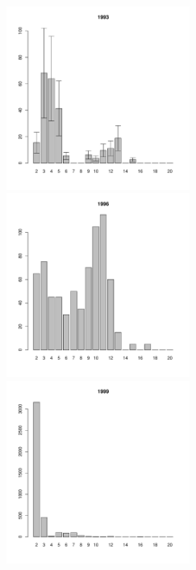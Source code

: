 \documentclass[12pt, a4paper]{article}
\begin{document}
\begin{figure}[h]
\begin{multicols}{3}
\end{multicols}



\begin{multicols}{3}
\hfill
\includegraphics[width=60mm]{../White_Sea/Luvenga_Goreliy/midlow2_1993_.pdf}
\hfill
\includegraphics[width=60mm]{../White_Sea/Luvenga_Goreliy/midlow2_1996_.pdf}
\hfill
\includegraphics[width=60mm]{../White_Sea/Luvenga_Goreliy/midlow2_1999_.pdf}

\end{multicols}



\end{figure}
\end{document}
